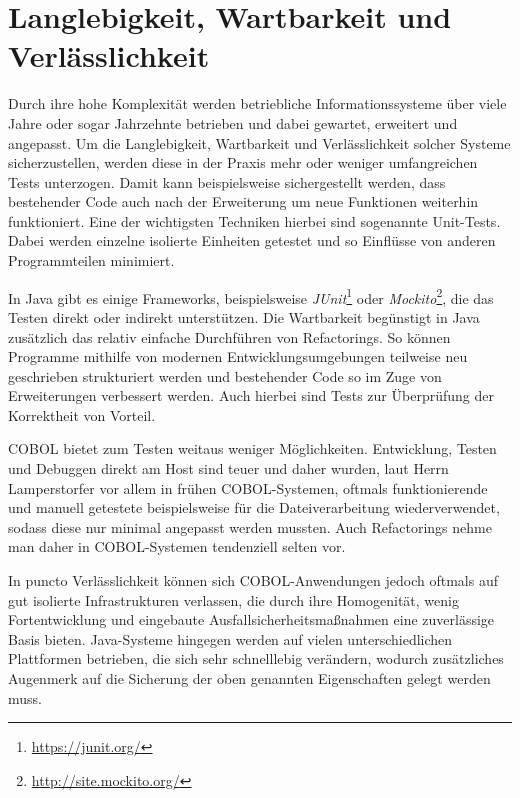 \section{Langlebigkeit, Wartbarkeit und Verlässlichkeit} \label{verlaesslichkeit}

Durch ihre hohe Komplexität werden betriebliche Informationssysteme \idR über viele Jahre oder sogar Jahrzehnte betrieben und dabei gewartet, erweitert und angepasst. Um die Langlebigkeit, Wartbarkeit und Verlässlichkeit solcher Systeme sicherzustellen, werden diese in der Praxis mehr oder weniger umfangreichen Tests unterzogen. Damit kann beispielsweise sichergestellt werden, dass bestehender Code auch nach der Erweiterung um neue Funktionen weiterhin funktioniert. Eine der wichtigsten Techniken hierbei sind sogenannte Unit-Tests. Dabei werden einzelne isolierte Einheiten getestet und so Einflüsse von anderen Programmteilen minimiert. 

In Java gibt es einige Frameworks, beispielsweise \textit{JUnit}\footnote{\url{https://junit.org/}} oder \textit{Mockito}\footnote{\url{http://site.mockito.org/}}, die das Testen direkt oder indirekt unterstützen. Die Wartbarkeit begünstigt in Java zusätzlich das relativ einfache Durchführen von Refactorings. So können Programme mithilfe von modernen Entwicklungsumgebungen teilweise neu geschrieben \bzw strukturiert werden und bestehender Code so im Zuge von Erweiterungen verbessert werden. Auch hierbei sind Tests zur Überprüfung der Korrektheit von Vorteil. 

COBOL bietet zum Testen weitaus weniger Möglichkeiten. Entwicklung, Testen und Debuggen direkt am Host sind teuer und daher wurden, laut Herrn Lamperstorfer vor allem in frühen COBOL-Systemen, oftmals funktionierende und manuell getestete  beispielsweise für die Dateiverarbeitung wiederverwendet, sodass diese nur minimal angepasst werden mussten. Auch Refactorings nehme man daher in COBOL-Systemen tendenziell selten vor.

In puncto Verlässlichkeit können sich COBOL-Anwendungen jedoch oftmals auf gut isolierte Infrastrukturen verlassen, die durch ihre Homogenität, wenig Fortentwicklung und eingebaute Ausfallsicherheitsmaßnahmen eine zuverlässige Basis bieten. Java-Systeme hingegen werden auf vielen unterschiedlichen Plattformen betrieben, die sich sehr schnelllebig verändern, wodurch zusätzliches Augenmerk auf die Sicherung der oben genannten Eigenschaften gelegt werden muss.